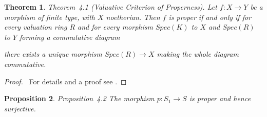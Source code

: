 \documentclass{memo-l}
\newtheorem{theorem}{Theorem}[section]
\newtheorem{proposition}[theorem]{Proposition}
\theoremstyle{definition}
\theoremstyle{remark}
\numberwithin{section}{chapter}
\numberwithin{equation}{chapter}
\begin{document}
\begin{theorem}{Theorem\ 4.1} (Valuative Criterion of Properness).
  Let $f: X \to Y$ be a morphism of finite type, with $X$ noetherian.
  Then $f$ is proper if and only if for every valuation ring $R$ and
  for every morphism $Spec(K)$ to $X$ and $Spec(R)$ to $Y$ forming a
  commutative diagram
\begin{figure}[htb]
\centering
{}
\end{figure}
there exists a unique morphism $Spec(R) {\to} X$ making the whole
diagram commutative.
\end{theorem}

\begin{proof} \   For details and a proof see \cite{MR0463157}.
\end{proof}


\begin{proposition}{Proposition\  4.2}
The morphism $p:S_{1} {\to} S$ is proper and
hence surjective.
\end{proposition}
\end{document}
